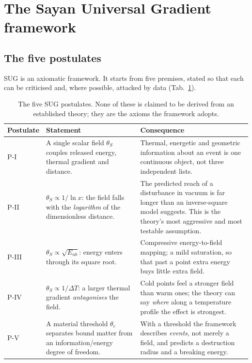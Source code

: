 \documentclass[11pt,a4paper]{article}
\newcommand{\thetaS}{\theta_{S}}
\begin{document}
\section{The Sayan Universal Gradient framework}
\label{sec:framework}

\subsection{The five postulates}

SUG is an axiomatic framework. It starts from five premises, stated so that
each can be criticised and, where possible, attacked by data
(Tab.~\ref{tab:postulates}).

\begin{table}[tb]
  \centering
  \caption{The five SUG postulates. None of these is claimed to be derived
  from an established theory; they are the axioms the framework adopts.}
  \label{tab:postulates}
  \begin{tabular}{@{}p{1.5cm}p{5.1cm}p{7.4cm}@{}}
    \toprule
    \textbf{Postulate} & \textbf{Statement} & \textbf{Consequence} \\
    \midrule
    P-I  & A single scalar field $\thetaS$ couples released energy, thermal
           gradient and distance. &
           Thermal, energetic and geometric information about an event is one
           continuous object, not three independent lists. \\[2pt]
    P-II & $\thetaS \propto 1/\ln x$: the field falls with the
           \emph{logarithm} of the dimensionless distance. &
           The predicted reach of a disturbance in vacuum is far longer than
           an inverse-square model suggests. This is the theory's most
           aggressive and most testable assumption. \\[2pt]
    P-III & $\thetaS \propto \sqrt{E_{nb}}$: energy enters through its
           square root. &
           Compressive energy-to-field mapping; a mild saturation, so that
           past a point extra energy buys little extra field. \\[2pt]
    P-IV & $\thetaS \propto 1/\Delta T$: a larger thermal gradient
           \emph{antagonises} the field. &
           Cold points feel a stronger field than warm ones; the theory can
           say \emph{where} along a temperature profile the effect is
           strongest. \\[2pt]
    P-V  & A material threshold $\theta_c$ separates bound matter from an
           information/energy degree of freedom. &
           With a threshold the framework describes \emph{events}, not merely
           a field, and predicts a destruction radius and a breaking energy. \\
    \bottomrule
  \end{tabular}
\end{table}
\end{document}
